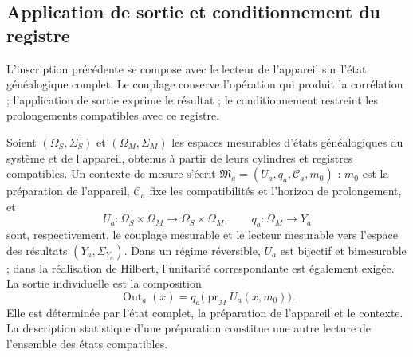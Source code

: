 \subsection{Application de sortie et conditionnement du registre}
\label{vii:sec:salida-condicionamiento}

L’inscription précédente se compose avec le lecteur de l’appareil sur
l’état généalogique complet. Le couplage conserve l’opération qui
produit la corrélation ; l’application de sortie exprime le résultat ; le
conditionnement restreint les prolongements compatibles avec ce registre.

Soient \((\Omega_S,\Sigma_S)\) et \((\Omega_M,\Sigma_M)\) les espaces
mesurables d’états généalogiques du système et de l’appareil, obtenus à partir de
leurs cylindres et registres compatibles. Un contexte de mesure s’écrit
\(\mathfrak M_a=(U_a,q_a,\mathcal C_a,m_0)\) : \(m_0\) est la
préparation de l’appareil, \(\mathcal C_a\) fixe les compatibilités et
l’horizon de prolongement, et
\[
 U_a:\Omega_S\times\Omega_M\longrightarrow\Omega_S\times\Omega_M,
 \qquad q_a:\Omega_M\longrightarrow Y_a
\]
sont, respectivement, le couplage mesurable et le lecteur mesurable vers l'espace des résultats \((Y_a,\Sigma_{Y_a})\). Dans un régime réversible, \(U_a\) est bijectif et bimesurable ; dans la réalisation de Hilbert, l'unitarité correspondante est également exigée. La sortie individuelle est la composition
\begin{equation}
 \operatorname{Out}_a(x)
 =q_a\bigl(\operatorname{pr}_M U_a(x,m_0)\bigr).
 \label{vii:eq:out-genealogico}
\end{equation}
Elle est déterminée par l’état complet, la préparation de l’appareil et
le contexte. La description statistique d’une préparation constitue
une autre lecture de l’ensemble des états compatibles.


